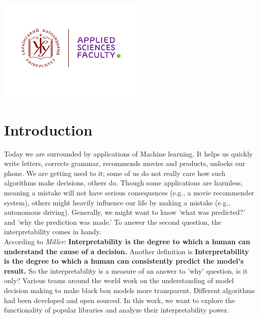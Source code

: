 \begin{titlepage}

\includegraphics[height=5cm]{UCU-Apps.png}\\[0.5cm] %
 

\end{titlepage}
\vspace*{0.8cm}
\section{Introduction}
Today we are surrounded by applications of Machine learning. It helps us quickly write letters, corrects grammar, recommends movies and products, unlocks our phone. We are getting used to it; some of us do not really care how such algorithms make decisions, others do. Though some applications are harmless, meaning a mistake will not have serious consequences (e.g., a movie recommender system), others might heavily influence our life by making a mistake (e.g., autonomous driving). Generally, we might want to know 'what was predicted?' and 'why the prediction was made.' To answer the second question, the interpretability comes in handy. \\
According to \textit{Miller}\cite{Miller}: \textbf{Interpretability is the degree to which a human can understand the cause of a decision.}
Another definition\cite{NIPS2016_6300} is \textbf{Interpretability is the degree to which a human can consistently predict the model’s result.} So the interpretability is a measure of an answer to 'why' question, is it only?  Various teams around the world work on the understanding of model decision making to make black box models more transparent. Different algorithms had been developed and open sourced. In this work, we want to explore the functionality of popular libraries and analyze their interpretability power.

